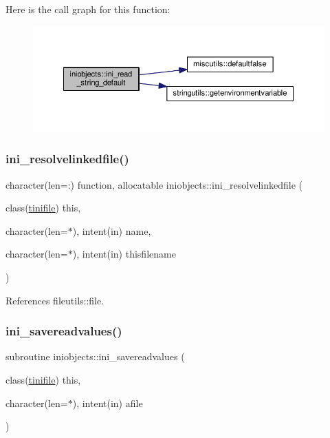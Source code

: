 Here is the call graph for this function\+:
\nopagebreak
\begin{figure}[H]
\begin{center}
\leavevmode
\includegraphics[width=350pt]{namespaceiniobjects_a7a7f7950cdd1ae3e2c9e977fb7ce87a7_cgraph}
\end{center}
\end{figure}
\mbox{\label{namespaceiniobjects_a292876b02309b0dec55346a08b3b2cdd}} 
\subsubsection{\texorpdfstring{ini\+\_\+resolvelinkedfile()}{ini\_resolvelinkedfile()}}
{\footnotesize\ttfamily character(len=\+:) function, allocatable iniobjects\+::ini\+\_\+resolvelinkedfile (\begin{DoxyParamCaption}\item[{class(\mbox{\hyperlink{structiniobjects_1_1tinifile}{tinifile}})}]{this,  }\item[{character(len=$\ast$), intent(in)}]{name,  }\item[{character(len=$\ast$), intent(in)}]{thisfilename }\end{DoxyParamCaption})\hspace{0.3cm}{\ttfamily [private]}}



References fileutils\+::file.

\mbox{\label{namespaceiniobjects_a3c4c3ca8183b5dcca8af9d4b19808462}} 
\subsubsection{\texorpdfstring{ini\+\_\+savereadvalues()}{ini\_savereadvalues()}}
{\footnotesize\ttfamily subroutine iniobjects\+::ini\+\_\+savereadvalues (\begin{DoxyParamCaption}\item[{class(\mbox{\hyperlink{structiniobjects_1_1tinifile}{tinifile}})}]{this,  }\item[{character(len=$\ast$), intent(in)}]{afile }\end{DoxyParamCaption})\hspace{0.3cm}{\ttfamily [private]}}

